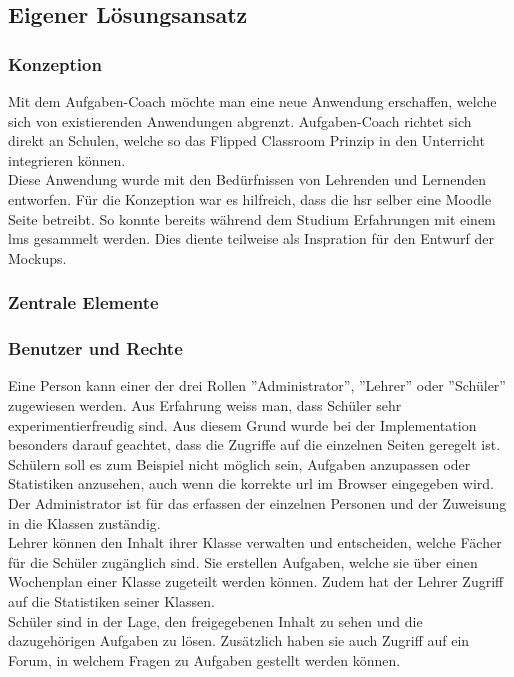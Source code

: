 \subsection{Eigener Lösungsansatz}
\subsubsection{Konzeption}
Mit dem Aufgaben-Coach möchte man eine neue Anwendung erschaffen, welche sich von existierenden Anwendungen abgrenzt. Aufgaben-Coach richtet sich direkt an Schulen, welche so das Flipped Classroom Prinzip in den Unterricht integrieren können. \\

Diese Anwendung wurde mit den Bedürfnissen von Lehrenden und Lernenden entworfen. Für die Konzeption war es hilfreich, dass die \gls{hsr} selber eine Moodle Seite betreibt. So konnte bereits während dem Studium Erfahrungen mit einem \gls{lms} gesammelt werden. Dies diente teilweise als Inspration für den Entwurf der Mockups.

\subsubsection{Zentrale Elemente}
\subsubsection*{Benutzer und Rechte}
Eine Person kann einer der drei Rollen ''Administrator'', ''Lehrer'' oder ''Schüler'' zugewiesen werden. Aus Erfahrung weiss man, dass Schüler sehr experimentierfreudig sind. Aus diesem Grund wurde bei der Implementation besonders darauf geachtet, dass die Zugriffe auf die einzelnen Seiten geregelt ist. Schülern soll es zum Beispiel nicht möglich sein, Aufgaben anzupassen oder Statistiken anzusehen, auch wenn die korrekte \gls{url} im Browser eingegeben wird. \\

Der Administrator ist für das erfassen der einzelnen Personen und der Zuweisung in die Klassen zuständig. \\

Lehrer können den Inhalt ihrer Klasse verwalten und entscheiden, welche Fächer für die Schüler zugänglich sind. Sie erstellen Aufgaben, welche sie über einen Wochenplan einer Klasse zugeteilt werden können. Zudem hat der Lehrer Zugriff auf die Statistiken seiner Klassen. \\

Schüler sind in der Lage, den freigegebenen Inhalt zu sehen und die dazugehörigen Aufgaben zu lösen. Zusätzlich haben sie auch Zugriff auf ein Forum, in welchem Fragen zu Aufgaben gestellt werden können.

